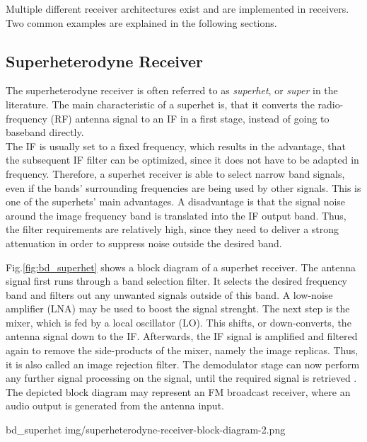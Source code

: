 Multiple different receiver architectures exist and are implemented in receivers.
Two common examples are explained in the following sections.

\subsection{Superheterodyne Receiver}

The superheterodyne receiver is often referred to as \textit{superhet}, or \textit{super} in the literature.
The main characteristic of a superhet is, that it converts the radio-frequency (RF) antenna signal to an IF in a first stage, instead of going to baseband directly.\\

The IF is usually set to a fixed frequency, which results in the advantage, that the subsequent IF filter can be optimized, since it does not have to be adapted in frequency.
Therefore, a superhet receiver is able to select narrow band signals, even if the bands' surrounding frequencies are being used by other signals.
This is one of the superhets' main advantages.
A disadvantage is that the signal noise around the image frequency band is translated into the IF output band.
Thus, the filter requirements are relatively high, since they need to deliver a strong attenuation in order to suppress noise outside the desired band.

Fig.\ref{fig:bd_superhet} shows a block diagram of a superhet receiver.
The antenna signal first runs through a band selection filter.
It selects the desired frequency band and filters out any unwanted signals outside of this band.
A low-noise amplifier (LNA) may be used to boost the signal strenght.
The next step is the mixer, which is fed by a local oscillator (LO).
This shifts, or down-converts, the antenna signal down to the IF.
Afterwards, the IF signal is amplified and filtered again to remove the side-products of the mixer, namely the image replicas.
Thus, it is also called an image rejection filter.
The demodulator stage can now perform any further signal processing on the signal, until the required signal is retrieved \cite{PassosFábio2020AHSo}.\\

The depicted block diagram may represent an FM broadcast receiver, where an audio output is generated from the antenna input.

 {bd_superhet} {img/superheterodyne-receiver-block-diagram-2.png}


